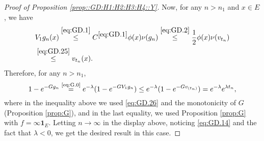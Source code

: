 \documentclass[12pt,a4paper]{amsart}
\numberwithin{equation}{section}
\theoremstyle{plain}
\theoremstyle{definition}
\theoremstyle{remark}
\begin{document}
\begin{proof}[Proof of Proposition \ref{prop::GD:H1:H2:H3:H4::Y}]
	Now, for any $n>n_1$ and $x\in E$, we have
\begin{align}
	& V_1g_n(x)
	\overset{\eqref{eq:GD.1}}\leq C^{\eqref{eq:GD.1}} \phi(x)\nu(g_n)
	\overset{\eqref{eq:GD.2}}\leq \frac{1}{2}\phi(x)\nu(v_{t_n})
	\\\label{eq:GD.26} & \overset{\eqref{eq:GD.25}}\leq v_{t_n}(x).
\end{align}
	Therefore, for any $n>n_1$,
\begin{equation}
	1 - e^{- Gg_n}
	\overset{\text{\eqref{eq:G.0}}}= e^{- \lambda} (1- e^{- GV_1g_n})
	\leq e^{- \lambda} (1- e^{- G v_{(t_n)}})
	= e^{- \lambda} e^{\lambda t_n},
\end{equation}
	where in the inequality above we used \eqref{eq:GD.26} and the monotonicity of $G$ (Proposition \ref{prop:G}), and in the last equality, we used Proposition \ref{prop:G} with $f = \infty \mathbf 1_E$.
	Letting $n\to \infty$ in the display above, noticing \eqref{eq:GD.14} and the fact that $\lambda < 0$,
	we get the desired result in this case.


\end{proof}
\end{document}
